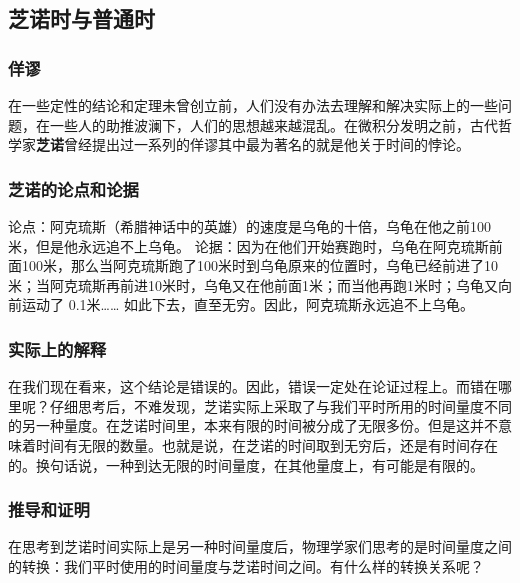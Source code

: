 
\begin{issues}

\end{issues}

\subsection{芝诺时与普通时}

\subsubsection{佯谬}
在一些定性的结论和定理未曾创立前，人们没有办法去理解和解决实际上的一些问题，在一些人的助推波澜下，人们的思想越来越混乱。在微积分发明之前，古代哲学家\textbf{芝诺}曾经提出过一系列的佯谬其中最为著名的就是他关于时间的悖论。

\subsubsection{芝诺的论点和论据}
论点：阿克琉斯（希腊神话中的英雄）的速度是乌龟的十倍，乌龟在他之前100米，但是他永远追不上乌龟。
论据：因为在他们开始赛跑时，乌龟在阿克琉斯前面100米，那么当阿克琉斯跑了100米时到乌龟原来的位置时，乌龟已经前进了10米；当阿克琉斯再前进10米时，乌龟又在他前面1米；而当他再跑1米时；乌龟又向前运动了  0.1米…… 如此下去，直至无穷。因此，阿克琉斯永远追不上乌龟。

\subsubsection{实际上的解释}
在我们现在看来，这个结论是错误的。因此，错误一定处在论证过程上。而错在哪里呢？仔细思考后，不难发现，芝诺实际上采取了与我们平时所用的时间量度不同的另一种量度。在芝诺时间里，本来有限的时间被分成了无限多份。但是这并不意味着时间有无限的数量。也就是说，在芝诺的时间取到无穷后，还是有时间存在的。换句话说，一种到达无限的时间量度，在其他量度上，有可能是有限的。

\subsubsection{推导和证明}
在思考到芝诺时间实际上是另一种时间量度后，物理学家们思考的是时间量度之间的转换：我们平时使用的时间量度与芝诺时间之间。有什么样的转换关系呢？

